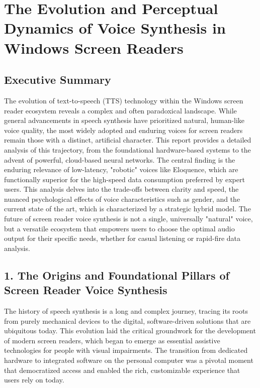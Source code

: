 \chapter{The Evolution and Perceptual Dynamics of Voice Synthesis in Windows Screen Readers}
\section{Executive Summary}
The evolution of text-to-speech (TTS) technology within the Windows
screen reader ecosystem reveals a complex and often paradoxical
landscape. While general advancements in speech synthesis have
prioritized natural, human-like voice quality, the most widely adopted
and enduring voices for screen readers remain those with a distinct,
artificial character. This report provides a detailed analysis of this
trajectory, from the foundational hardware-based systems to the advent
of powerful, cloud-based neural networks. The central finding is the
enduring relevance of low-latency, "robotic" voices like Eloquence,
which are functionally superior for the high-speed data consumption
preferred by expert users. This analysis delves into the trade-offs
between clarity and speed, the nuanced psychological effects of voice
characteristics such as gender, and the current state of the art, which
is characterized by a strategic hybrid model. The future of screen
reader voice synthesis is not a single, universally "natural" voice,
but a versatile ecosystem that empowers users to choose the optimal
audio output for their specific needs, whether for casual listening or
rapid-fire data analysis.

\section{1. The Origins and Foundational Pillars of Screen Reader Voice Synthesis}
The history of speech synthesis is a long and complex journey, tracing
its roots from purely mechanical devices to the digital, software-driven
solutions that are ubiquitous today. This evolution laid the critical
groundwork for the development of modern screen readers, which began to
emerge as essential assistive technologies for people with visual
impairments. The transition from dedicated hardware to integrated
software on the personal computer was a pivotal moment that democratized
access and enabled the rich, customizable experience that users rely on
today.

